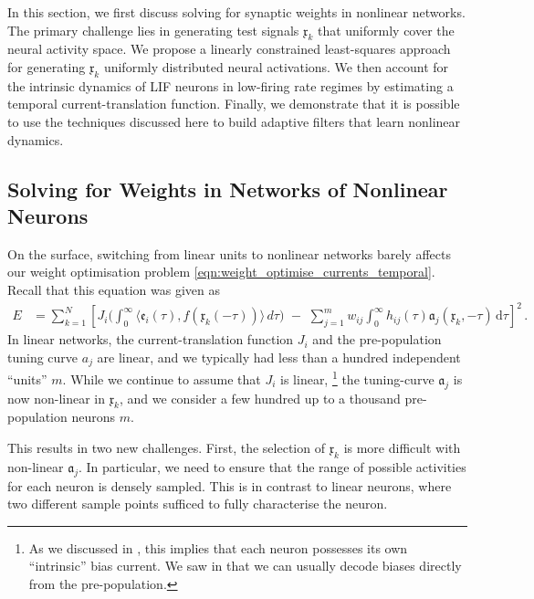 In this section, we first discuss solving for synaptic weights in nonlinear networks.
The primary challenge lies in generating test signals $\mathfrak{x}_k$ that uniformly cover the neural activity space.
We propose a linearly constrained least-squares approach for generating $\mathfrak{x}_k$ uniformly distributed neural activations.
We then account for the intrinsic dynamics of LIF neurons in low-firing rate regimes by estimating a temporal current-translation function.
Finally, we demonstrate that it is possible to use the techniques discussed here to build adaptive filters that learn nonlinear dynamics.

\subsection{Solving for Weights in Networks of Nonlinear Neurons}
\label{sec:solve_dynamics_nonlinear_neurons}

On the surface, switching from linear units to nonlinear networks barely affects our weight optimisation problem \cref{eqn:weight_optimise_currents_temporal}.
Recall that this equation was given as
\begin{align}
	E &= \sum_{k = 1}^N \left[
		J_i \Big( \! \int_0^\infty \!\!\! \big\langle \mathfrak{e}_i(\tau), f(\mathfrak{x}_k(-\tau)) \big\rangle \, \mathit{d\tau} \Big) \,\,-\,\,
		\sum_{j = 1}^m w_{ij} \! \int_0^\infty \!\!\! h_{ij}(\tau) \mathfrak{a}_j(\mathfrak{x}_k, -\tau) \,\mathrm{d}\tau
	\right]^2 \,.
	\tag{4.7}
\end{align}
In linear networks, the current-translation function $J_i$ and the pre-population tuning curve $a_j$ are linear, and we typically had less than a hundred independent \enquote{units} $m$.
While we continue to assume that $J_i$ is linear,%
\footnote{
As we discussed in , this implies that each neuron possesses its own \enquote{intrinsic} bias current.
We saw in  that we can usually decode biases directly from the pre-population.
}
the tuning-curve $\mathfrak{a}_j$ is now non-linear in $\mathfrak{x}_k$, and we consider a few hundred up to a thousand pre-population neurons $m$.

This results in two new challenges.
First, the selection of $\mathfrak{x}_k$ is more difficult with non-linear $\mathfrak{a}_j$.
In particular, we need to ensure that the range of possible activities for each neuron is densely sampled.
This is in contrast to linear neurons, where two different sample points sufficed to fully characterise the neuron.


